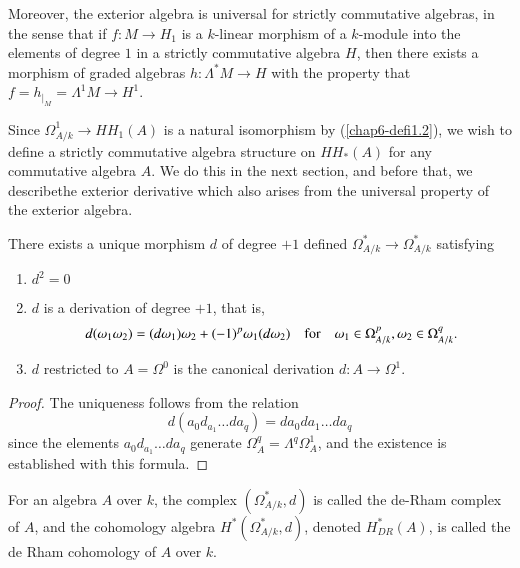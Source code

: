 Moreover, the exterior algebra is universal for strictly commutative
algebras, in the sense that if $f:M\to H_{1}$ is a $k$-linear morphism
of a $k$-module into the elements of degree $1$ in a strictly
commutative algebra $H$, then there exists a morphism of graded
algebras $h:\Lambda^{*}M\to H$ with the property that
$f=h_{|_{M}}=\Lambda^{1}M\to H^{1}$.

Since $\Omega^{1}_{A/k}\to HH_{1}(A)$ is a natural isomorphism by 
(\ref{chap6-defi1.2}), we wish to define a strictly commutative
algebra structure on $HH_{\ast}(A)$ for any commutative algebra
$A$. We do this in the next section, and before that, we
describe\pageoriginale the exterior derivative which also arises from
the universal property of the exterior algebra.

\begin{proposition}\label{chap6-prop1.8}
There exists a unique morphism $d$ of degree $+1$ defined
$\Omega^{*}_{A/k}\to \Omega^{*}_{A/k}$ satisfying
\begin{enumerate}
\renewcommand{\theenumi}{\alph{enumi}}
\renewcommand{\labelenumi}{\rm(\theenumi)}
\item $d^{2}=0$

\item $d$ is a derivation of degree $+1$, that is,
{\fontsize{10}{12}\selectfont
$$
d(\omega_{1}\omega_{2})=(d\omega_{1})\omega_{2}+(-1)^{p}\omega_{1}(d\omega_{2})\quad\text{for}\quad
\omega_{1}\in \Omega^{p}_{A/k},\omega_{2}\in \Omega^{q}_{A/k}. 
$$}

\item $d$ restricted to $A=\Omega^{0}$ is the canonical derivation
  $d:A\to \Omega^{1}$.
\end{enumerate}
\end{proposition}

\begin{proof}
The uniqueness follows from the relation
$$
d(a_{0}d_{a_{1}}\ldots da_{q})=da_{0}da_{1}\ldots da_{q}
$$
since the elements $a_{0}d_{a_{1}}\ldots da_{q}$ generate
$\Omega^{q}_{A}=\Lambda^{q}\Omega^{1}_{A}$, and the existence is
established with this formula.
\end{proof}

\begin{definition}\label{chap6-defi1.9}
For an algebra $A$ over $k$, the complex $(\Omega^{*}_{A/k},d)$ is
called the de-Rham complex of $A$, and the cohomology algebra
$H^{*}(\Omega^{*}_{A/k},d)$, denoted $H^{*}_{DR}(A)$, is called the de
Rham cohomology of $A$ over $k$.
\end{definition}

